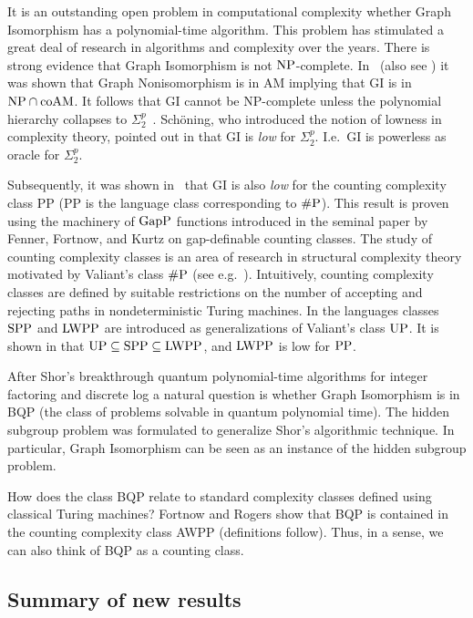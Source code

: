 \documentclass{elsart}
\newcommand{\UP}{\mbox{\rm UP}}
\newcommand{\PP}{\mbox{\rm PP}}
\newcommand{\GapP}{\mbox{\rm GapP}}
\newcommand{\NP}{\mbox{\rm NP}}
\newcommand{\numP}{\mbox{\rm \#P}}
\newcommand{\LWPP}{\mbox{\rm LWPP}}
\newcommand{\SPP}{\mbox{\rm SPP}}
\newcommand{\coAM}{\mbox{\rm coAM}}
\begin{document}
It is an outstanding open problem in computational complexity whether
Graph Isomorphism has a polynomial-time algorithm. This problem has
stimulated a great deal of research in algorithms and complexity over
the years. There is strong evidence that Graph Isomorphism is not
$\NP$-complete. In~\cite{babai84trading} (also see
\cite{babai88arthur}) it was shown that Graph Nonisomorphism is in AM
implying that GI is in $\NP\cap\coAM$. It follows that GI cannot be
NP-complete unless the polynomial hierarchy collapses to
$\Sigma^p_2$~\cite{boppana87does,schoning87graph}. Sch\"oning, who
introduced the notion of lowness in complexity theory, pointed out in
\cite{schoning87graph} that GI is {\em low\/} for $\Sigma^p_2$.  I.e.\
GI is powerless as oracle for $\Sigma^p_2$.

Subsequently, it was shown in~\cite{kobler92graph} that GI is also
{\em low\/} for the counting complexity class PP (PP is the language
class corresponding to $\numP$). This result is proven using the
machinery of $\GapP$ functions introduced in the seminal paper by
Fenner, Fortnow, and Kurtz \cite{fenner91gapdefinable} on
gap-definable counting classes. The study of counting complexity
classes is an area of research in structural complexity theory
motivated by Valiant's class $\numP$ (see e.g.\
\cite{fenner91gapdefinable}). Intuitively, counting complexity classes
are defined by suitable restrictions on the number of accepting and
rejecting paths in nondeterministic Turing machines. In
\cite{fenner91gapdefinable} the languages classes $\SPP$ and $\LWPP$
are introduced as generalizations of Valiant's class $\UP$. It is
shown in \cite{fenner91gapdefinable} that
$\UP\subseteq\SPP\subseteq\LWPP$, and $\LWPP$ is low for $\PP$.

After Shor's breakthrough quantum polynomial-time algorithms for
integer factoring and discrete log \cite{shor97polynomialtime} a
natural question is whether Graph Isomorphism is in BQP (the class of
problems solvable in quantum polynomial time). The hidden subgroup
problem was formulated to generalize Shor's algorithmic technique. In
particular, Graph Isomorphism can be seen as an instance of the hidden
subgroup problem.

How does the class BQP relate to standard complexity classes defined
using classical Turing machines? Fortnow and Rogers
\cite{fortnow98complexity} show that BQP is contained in the counting
complexity class AWPP (definitions follow). Thus, in a sense, we can
also think of BQP as a counting class.

\subsection{ Summary of new results}
\end{document}
